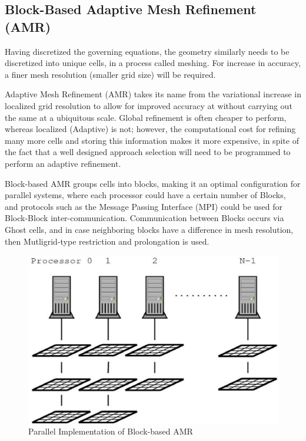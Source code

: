 \subsection{Block-Based Adaptive Mesh Refinement (AMR)}
Having discretized the governing equations, the geometry similarly needs to be discretized into unique cells, in a process called meshing. For increase in accuracy, a finer mesh resolution (smaller grid size) will be required. \par

Adaptive Mesh Refinement (AMR) takes its name from the variational increase in localized grid resolution to allow for improved accuracy at without carrying out the same at a ubiquitous scale. Global refinement is often cheaper to perform, whereas localized (Adaptive) is not; however, the computational cost for refining many more cells and storing this information makes it more expensive, in spite of the fact that a well designed approach selection will need to be programmed to perform an adaptive refinement.\par
Block-based AMR groups cells into blocks, making it an optimal configuration for parallel systems, where each processor could have a certain number of Blocks, and protocols such as the Message Passing Interface (MPI) could be used for Block-Block inter-communication. Communication between Blocks occurs via Ghost cells, and in case neighboring blocks have a difference in mesh resolution, then Mutligrid-type restriction and prolongation is used.\par

\begin{figure}
    \vspace{0.2cm}
    \begin{center}
      \includegraphics[height=0.35\textwidth]{./figs/parallel-domain-decomp.eps}
    \end{center}
    \caption{Parallel Implementation of Block-based AMR \cite{Northrup:2013}}  
    \vspace{0.2cm}
\end{figure}

